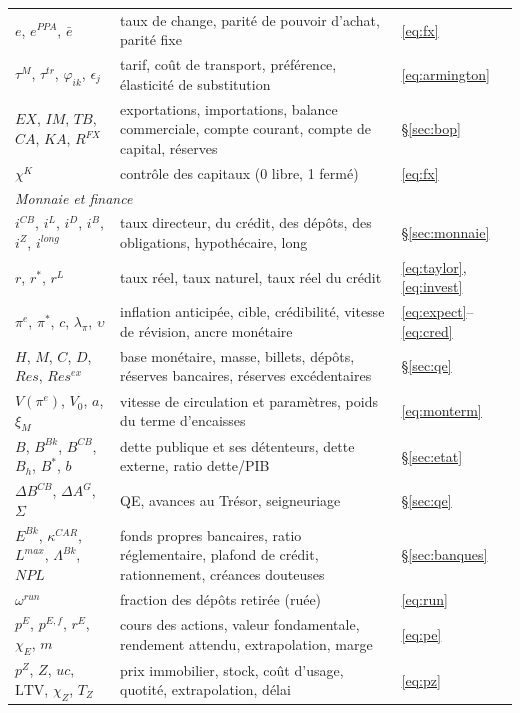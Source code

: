 \documentclass[11pt,a4paper]{article}
\begin{document}
\begin{longtable}{p{4.3cm}p{7.8cm}p{3.3cm}}
$e$, $e^{PPA}$, $\bar e$ & taux de change, parité de pouvoir d'achat, parité fixe & \eqref{eq:fx}\\
$\tau^M$, $\tau^{tr}$, $\varphi_{ik}$, $\epsilon_j$ & tarif, coût de transport, préférence, élasticité de substitution & \eqref{eq:armington}\\
$EX$, $IM$, $TB$, $CA$, $KA$, $R^{FX}$ & exportations, importations, balance commerciale, compte courant, compte de capital, réserves & \S\ref{sec:bop}\\
$\chi^K$ & contrôle des capitaux (0 libre, 1 fermé) & \eqref{eq:fx}\\
\midrule
\multicolumn{3}{l}{\emph{Monnaie et finance}}\\
$i^{CB}$, $i^L$, $i^D$, $i^B$, $i^Z$, $i^{long}$ & taux directeur, du crédit, des dépôts, des obligations, hypothécaire, long & \S\ref{sec:monnaie}\\
$r$, $r^\ast$, $r^L$ & taux réel, taux naturel, taux réel du crédit & \eqref{eq:taylor}, \eqref{eq:invest}\\
$\pi^e$, $\pi^\ast$, $c$, $\lambda_\pi$, $\upsilon$ & inflation anticipée, cible, crédibilité, vitesse de révision, ancre monétaire & \eqref{eq:expect}--\eqref{eq:cred}\\
$H$, $M$, $C$, $D$, $Res$, $Res^{ex}$ & base monétaire, masse, billets, dépôts, réserves bancaires, réserves excédentaires & \S\ref{sec:qe}\\
$V(\pi^e)$, $V_0$, $a$, $\xi_M$ & vitesse de circulation et paramètres, poids du terme d'encaisses & \eqref{eq:monterm}\\
$B$, $B^{Bk}$, $B^{CB}$, $B_h$, $B^\ast$, $b$ & dette publique et ses détenteurs, dette externe, ratio dette/PIB & \S\ref{sec:etat}\\
$\Delta B^{CB}$, $\Delta A^G$, $\Sigma$ & QE, avances au Trésor, seigneuriage & \S\ref{sec:qe}\\
$E^{Bk}$, $\kappa^{CAR}$, $L^{max}$, $\Lambda^{Bk}$, $NPL$ & fonds propres bancaires, ratio réglementaire, plafond de crédit, rationnement, créances douteuses & \S\ref{sec:banques}\\
$\omega^{run}$ & fraction des dépôts retirée (ruée) & \eqref{eq:run}\\
$p^E$, $p^{E,f}$, $r^E$, $\chi_E$, $m$ & cours des actions, valeur fondamentale, rendement attendu, extrapolation, marge & \eqref{eq:pe}\\
$p^Z$, $Z$, $uc$, $\mathrm{LTV}$, $\chi_Z$, $T_Z$ & prix immobilier, stock, coût d'usage, quotité, extrapolation, délai & \eqref{eq:pz}\\

\end{longtable}
\end{document}
